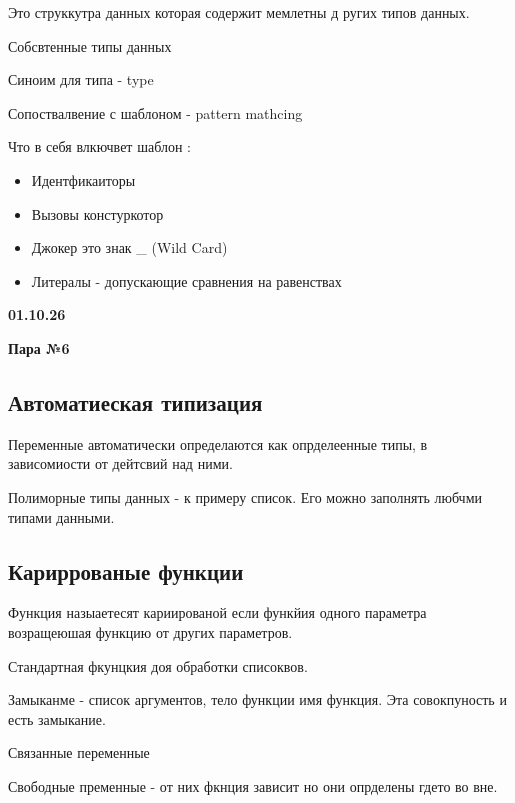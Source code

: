 \documentclass{article}
\begin{document}
Это струккутра данных которая содержит мемлетны д ругих типов данных.

Собсвтенные типы данных

Синоим для типа - type 

Сопоствалвение с шаблоном - pattern mathcing


Что в себя влкючвет шаблон :

\begin{itemize}
    \item Идентфикаиторы
    \item Вызовы констуркотор
    \item Джокер это знак \_ (Wild Card)
    \item Литералы - допускающие сравнения на равенствах
\end{itemize}


\textbf{01.10.26}

\textbf{Пара №6}

\subsection{Автоматиеская типизация}

Переменные автоматически определаются как опрделеенные типы, в зависомиости 
от дейтсвий над ними.

Полиморные типы данных - к примеру список. Его можно заполнять любчми 
типами данными.

\subsection{Кариррованые функции}


Функция назыаетесят кариированой если функйия одного параметра возращеюшая 
функцию от других параметров. 

Стандартная фкунцкия доя обработки списоквов.

Замыканме - список аргументов, тело функции имя функция. Эта совокпуность и есть замыкание.

Связанные переменные 

Свободные пременные - от них фкнция зависит но они опрделены гдето во вне.
\end{document}
